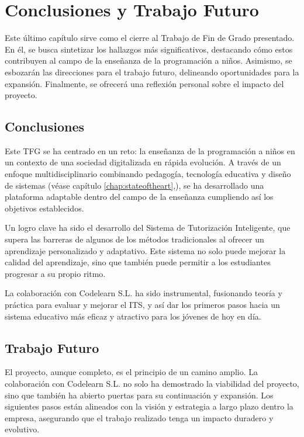 \chapter{Conclusiones y Trabajo Futuro} \label{chap:conclusiones}

Este último capítulo sirve como el cierre al Trabajo de Fin de Grado presentado. En él, se busca sintetizar los hallazgos más significativos, destacando cómo estos contribuyen al campo de la enseñanza de la programación a niños. Asimismo, se esbozarán las direcciones para el trabajo futuro, delineando oportunidades para la expansión. Finalmente, se ofrecerá una reflexión personal sobre el impacto del proyecto.

\section{Conclusiones}

Este TFG se ha centrado en un reto: la enseñanza de la programación a niños en un contexto de una sociedad digitalizada en rápida evolución. A través de un enfoque multidisciplinario combinando pedagogía, tecnología educativa y diseño de sistemas (véase capítulo \ref{chap:stateoftheart},), se ha desarrollado una plataforma adaptable dentro del campo de la enseñanza cumpliendo así los objetivos establecidos.

Un logro clave ha sido el desarrollo del Sistema de Tutorización Inteligente, que supera las barreras de algunos de los métodos tradicionales al ofrecer un aprendizaje personalizado y adaptativo. Este sistema no solo puede mejorar la calidad del aprendizaje, sino que también puede permitir a los estudiantes progresar a su propio ritmo.

La colaboración con Codelearn S.L. ha sido instrumental, fusionando teoría y práctica para evaluar y mejorar el ITS, y así dar los primeros pasos hacia un sistema educativo más eficaz y atractivo para los jóvenes de hoy en día.

\section{Trabajo Futuro}

El proyecto, aunque completo, es el principio de un camino amplio. La colaboración con Codelearn S.L. no solo ha demostrado la viabilidad del proyecto, sino que también ha abierto puertas para su continuación y expansión. Los siguientes pasos están alineados con la visión y estrategia a largo plazo dentro la empresa, asegurando que el trabajo realizado tenga un impacto duradero y evolutivo.

